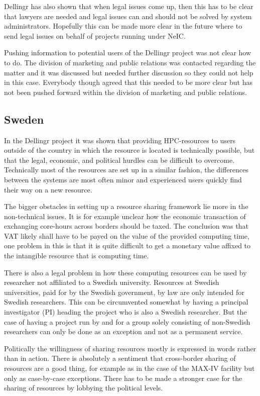 \documentclass{article}
\newcommand{\dell}{Dellingr\xspace}
\begin{document}
\dell has also shown that when legal issues come up, then this has to be clear that lawyers are needed and legal issues can and should not be solved by system administrators. 
Hopefully this can be made more clear in the future where to send legal issues on behalf of projects running under NeIC.

Pushing information to potential users of the \dell project was not clear how to do. 
The division of marketing and public relations was contacted regarding the matter and it was discussed but needed further discussion so they could not help in this case. 
Everybody though agreed that this needed to be more clear but has not been pushed forward within the division of marketing and public relations. 

\subsection{Sweden}

In the \dell project it was shown that providing HPC-resources to users outside of the country in which the resource is located is technically possible, but that the legal, economic, and political hurdles can be difficult to overcome. 
Technically most of the resources are set up in a similar fashion, the differences between the systems are most often minor and experienced users quickly find their way on a new resource. 

The bigger obstacles in setting up a resource sharing framework lie more in the non-technical issues. 
It is for example unclear how the economic transaction of exchanging core-hours across borders should be taxed. 
The conclusion was that VAT likely shall have to be payed on the value of the provided computing time, one problem in this is that it is quite difficult to get a monetary value affixed to the intangible resource that is computing time. 

There is also a legal problem in how these computing resources can be used by researcher not affiliated to a Swedish university. 
Resources at Swedish universities, paid for by the Swedish government, by law are only intended for Swedish researchers. 
This can be circumvented somewhat by having a principal investigator (PI) heading the project who is also a Swedish researcher. 
But the case of having a project run by and for a group solely consisting of non-Swedish researchers can only be done as an exception and not as a permanent service. 

Politically the willingness of sharing resources mostly is expressed in words rather than in action. 
There is absolutely a sentiment that cross-border sharing of resources are a good thing, for example as in the case of the MAX-IV facility but only as case-by-case exceptions. 
There has to be made a stronger case for the sharing of resources by lobbying the political levels.
\end{document}
